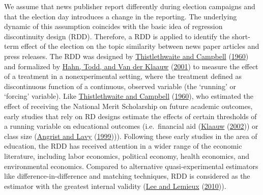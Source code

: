 \documentclass[
]{article}
\begin{document}
We assume that news publisher report differently during election
campaigns and that the election day introduces a change in the
reporting. The underlying dynamic of this assumption coincides with the
basic idea of regression discontinuity design (RDD). Therefore, a RDD is
applied to identify the short-term effect of the election on the topic
similarity between news paper articles and press releases. The RDD was
designed by
\protect\hyperlink{ref-thistlethwaite_regression-discontinuity_1960}{Thistlethwaite
and Campbell}
(\protect\hyperlink{ref-thistlethwaite_regression-discontinuity_1960}{1960})
and formalized by \protect\hyperlink{ref-hahn_identification_2001}{Hahn,
Todd, and Van der Klaauw}
(\protect\hyperlink{ref-hahn_identification_2001}{2001}) to measure the
effect of a treatment in a nonexperimental setting, where the treatment
defined as discontinuous function of a continuous, observed variable
(the `running' or `forcing' variable). Like
\protect\hyperlink{ref-thistlethwaite_regression-discontinuity_1960}{Thistlethwaite
and Campbell}
(\protect\hyperlink{ref-thistlethwaite_regression-discontinuity_1960}{1960}),
who estimated the effect of receiving the National Merit Scholarship on
future academic outcomes, early studies that rely on RD designs estimate
the effects of certain thresholds of a running variable on educational
outcomes (i.e.~financial aid
(\protect\hyperlink{ref-van_der_klaauw_estimating_2002}{Klaauw}
(\protect\hyperlink{ref-van_der_klaauw_estimating_2002}{2002})) or class
size (\protect\hyperlink{ref-angrist_using_1999}{Angrist and Lavy}
(\protect\hyperlink{ref-angrist_using_1999}{1999}))). Following these
early studies in the area of education, the RDD has received attention
in a wider range of the economic literature, including labor economics,
political economy, health economics, and environmental economics.
Compared to alternative quasi-experimental estimators like
difference-in-difference and matching techniques, RDD is considered as
the estimator with the greatest internal validity
(\protect\hyperlink{ref-lee_regression_2010}{Lee and Lemieux}
(\protect\hyperlink{ref-lee_regression_2010}{2010})).
\end{document}
